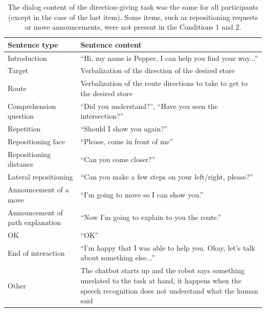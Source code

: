 \documentclass[a4paper,11pt,twoside]{StyleThese}
\begin{document}
\begin{table}[htp]
\centering
\begin{tabularx}{\textwidth}{p{4.5cm}|X}

Sentence type                    & Sentence content                                                                    \\ \hline\hline
Introduction                     & ``Hi, my name is Pepper, I can help you find your way...''                          \\ \hline
Target                           & Verbalization of the direction of the desired store                                 \\ \hline
Route                            & Verbalization of the route directions to take to get to the desired store           \\ \hline
Comprehension question           & ``Did you understand?'', ``Have you seen the intersection?''                        \\ \hline
Repetition                       & ``Should I show you again?''                                                        \\ \hline
Repositioning face               & ``Please, come in front of me''                                                     \\ \hline
Repositioning distance           & ``Can you come closer?''                                                            \\ \hline
Lateral repositioning            & ``Can you make a few steps on your left/right, please?''                            \\ \hline
Announcement of a move           & ``I'm going to move so I can show you.''                                            \\ \hline
Announcement of path explanation & ``Now I'm going to explain to you the route.''                                      \\ \hline
OK                               & ``OK''                                                                              \\ \hline
End of interaction               & ``I'm happy that I was able to help you. Okay, let's talk about something else...'' \\ \hline
Other                            & The chatbot starts up and the robot says something unrelated to the task at hand, it happens when the speech recognition does not understand what the human said                                                                                    \\
\end{tabularx}
\caption{The dialog content of the direction-giving task was the same for all participants (except in the case of the last item). Some items, such as repositioning requests or move announcements, were not present in the Conditions 1 and 2.}
\label{chap8:tab:dialog}
\end{table}
\end{document}
